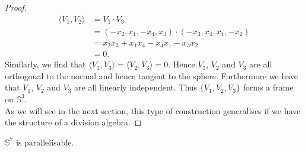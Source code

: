 \begin{proof}
\begin{align*}
\langle V_1,V_2\rangle &=V_1\cdot V_3\\
&=(-x_2,x_1,-x_4,x_3)\cdot (-x_3,x_4,x_1,-x_2)\\
&=x_2x_3+x_1x_4-x_4x_1-x_3x_2\\
&=0.
\end{align*}
Similarly, we find that $\langle V_1,V_3\rangle=\langle V_2,V_3\rangle=0$. Hence $V_1$, $V_2$ and $V_3$ are all orthogonal to the normal and hence tangent to the sphere. Furthermore we have that $V_1$, $V_2$ and $V_3$ are all linearly independent. Thus $\{V_1,V_2,V_3\}$ forms a frame on $\mathbb{S}^3$.\\

As we will see in the next section, this type of construction generalises if we have the structure of a division algebra.
\end{proof}
\begin{proposition}
$\mathbb{S}^7$ is parallelisable.
\end{proposition}

